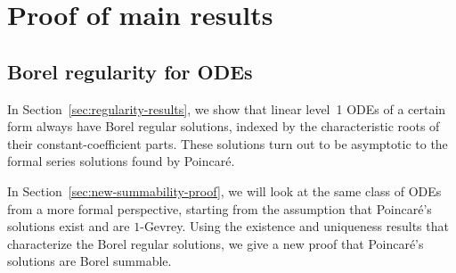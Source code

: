 \documentclass{article}
\theoremstyle{definition}
\theoremstyle{plain}
\begin{document}
\section{Proof of main results}\label{sec:proof_main_results}
%
\subsection{Borel regularity for ODEs}\label{borel_reg-ODE}
In Section~\ref{sec:regularity-results}, we show that linear level~1 ODEs of a certain form always have Borel regular solutions, indexed by the characteristic roots of their constant-coefficient parts. These solutions turn out to be asymptotic to the formal series solutions found by Poincar\'{e}.

In Section~\ref{sec:new-summability-proof}, we will look at the same class of ODEs from a more formal perspective, starting from the assumption that Poincar\'{e}'s solutions exist and are $1$-Gevrey. Using the existence and uniqueness results that characterize the Borel regular solutions, we give a new proof that Poincar\'{e}'s solutions are Borel summable.
%
\end{document}
